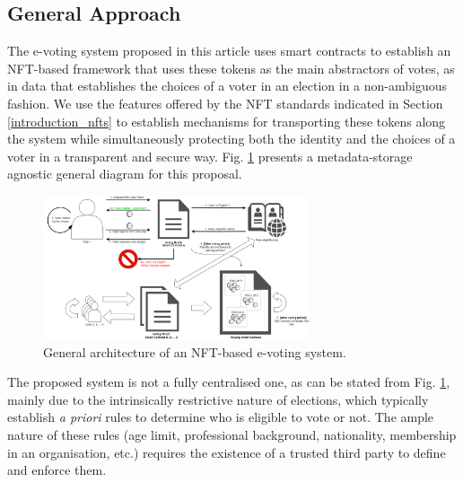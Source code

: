 \documentclass[../main.tex]{subfiles}
\begin{document}
\subsection{General Approach}
The e-voting system proposed in this article uses smart contracts to establish an NFT-based framework that uses these tokens as the main abstractors of votes, as in data that establishes the choices of a voter in an election in a non-ambiguous fashion. We use the features offered by the NFT standards indicated in Section \ref{introduction_nfts} to establish mechanisms for transporting these tokens along the system while simultaneously protecting both the identity and the choices of a voter in a transparent and secure way. Fig. \ref{fig:general_architecture} presents a metadata-storage agnostic general diagram for this proposal.

\begin{figure}[htp]
    \centering
    \includegraphics[width=0.7\textwidth]{../Images/01_general_solution.png}
    \caption{General architecture of an NFT-based e-voting system.}
    \label{fig:general_architecture}
\end{figure}

The proposed system is not a fully centralised one, as can be stated from Fig. \ref{fig:general_architecture}, mainly due to the intrinsically restrictive nature of elections, which typically establish \textit{a priori} rules to determine who is eligible to vote or not. The ample nature of these rules (age limit, professional background, nationality, membership in an organisation, etc.) requires the existence of a trusted third party to define and enforce them.
\end{document}
